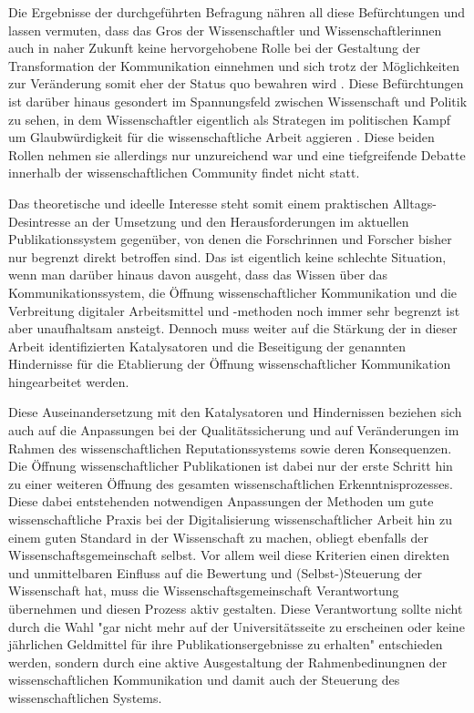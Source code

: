Die Ergebnisse der durchgeführten Befragung nähren all diese Befürchtungen und lassen vermuten, dass das Gros der Wissenschaftler und Wissenschaftlerinnen auch in naher Zukunft keine hervorgehobene Rolle bei der Gestaltung der Transformation der Kommunikation einnehmen und sich trotz der Möglichkeiten zur Veränderung somit eher der Status quo bewahren wird \cite{nosek_2012_scientific}. Diese Befürchtungen ist darüber hinaus gesondert im Spannungsfeld zwischen Wissenschaft und Politik zu sehen, in dem Wissenschaftler eigentlich als Strategen im politischen Kampf um Glaubwürdigkeit für die wissenschaftliche Arbeit aggieren \cite{latour_2013_laboratory}. Diese beiden Rollen nehmen sie allerdings nur unzureichend war und eine tiefgreifende Debatte innerhalb der wissenschaftlichen Community findet nicht statt.

Das theoretische und ideelle Interesse steht somit einem praktischen Alltags-Desintresse an der Umsetzung und den Herausforderungen im aktuellen Publikationssystem gegenüber, von denen die Forschrinnen und Forscher bisher nur begrenzt direkt betroffen sind. Das ist eigentlich keine schlechte Situation, wenn man darüber hinaus davon ausgeht, dass das Wissen über das Kommunikationssystem, die Öffnung wissenschaftlicher Kommunikation und die Verbreitung digitaler Arbeitsmittel und -methoden noch immer sehr begrenzt ist aber unaufhaltsam ansteigt. Dennoch muss weiter auf die Stärkung der in dieser Arbeit identifizierten Katalysatoren und die Beseitigung der genannten Hindernisse für die Etablierung der Öffnung wissenschaftlicher Kommunikation hingearbeitet werden.

Diese Auseinandersetzung mit den Katalysatoren und Hindernissen beziehen sich auch auf die Anpassungen bei der Qualitätssicherung und auf Veränderungen im Rahmen des wissenschaftlichen Reputationssystems sowie deren Konsequenzen. Die Öffnung wissenschaftlicher Publikationen ist dabei nur der erste Schritt hin zu einer weiteren Öffnung des gesamten wissenschaftlichen Erkenntnisprozesses. Diese dabei entstehenden notwendigen Anpassungen der Methoden um gute wissenschaftliche Praxis bei der Digitalisierung wissenschaftlicher Arbeit hin zu einem guten Standard in der Wissenschaft zu machen, obliegt ebenfalls der Wissenschaftsgemeinschaft selbst. Vor allem weil diese Kriterien einen direkten und unmittelbaren Einfluss auf die Bewertung und (Selbst-)Steuerung der Wissenschaft hat, muss die Wissenschaftsgemeinschaft Verantwortung übernehmen und diesen Prozess aktiv gestalten. Diese Verantwortung sollte nicht durch die Wahl "gar nicht mehr auf der Universitätsseite zu erscheinen oder keine jährlichen Geldmittel für ihre Publikationsergebnisse zu erhalten" \cite{Warnke_2012} entschieden werden, sondern durch eine aktive Ausgestaltung der Rahmenbedinungnen der wissenschaftlichen Kommunikation und damit auch der Steuerung des wissenschaftlichen Systems.

